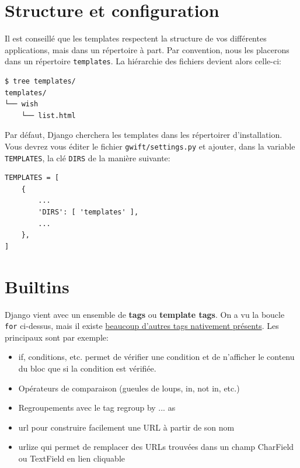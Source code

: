\documentclass[11pt]{amsbook}
\begin{document}
\hypertarget{x-structure-et-configuration}{\section{Structure et configuration}}
Il est conseillé que les templates respectent la structure de vos différentes applications, mais dans un répertoire à part. Par convention, nous les placerons dans un répertoire \texttt{templates}. La hiérarchie des fichiers devient alors celle-ci:


\begin{verbatim}
$ tree templates/
templates/
└── wish
    └── list.html
\end{verbatim}

Par défaut, Django cherchera les templates dans les répertoirer d’installation. Vous devrez vous éditer le fichier \texttt{gwift/settings.py} et ajouter, dans la variable \texttt{TEMPLATES}, la clé \texttt{DIRS} de la manière suivante:


\begin{verbatim}
TEMPLATES = [
    {
        ...
        'DIRS': [ 'templates' ],
        ...
    },
]
\end{verbatim}

\hypertarget{x-builtins}{\section{Builtins}}
Django vient avec un ensemble de \textbf{tags} ou \textbf{template tags}. On a vu la boucle \texttt{for} ci-dessus, mais il existe \href{https://docs.djangoproject.com/fr/1.9/ref/templates/builtins/}{beaucoup d’autres tags nativement présents}. Les principaux sont par exemple:


\begin{itemize}

\item if, conditions, etc. permet de vérifier une condition et de n’afficher le contenu du bloc que si la condition est vérifiée.

\item Opérateurs de comparaison (gueules de loups, in, not in, etc.)

\item Regroupements avec le tag regroup by ... as 

\item url pour construire facilement une URL à partir de son nom

\item urlize qui permet de remplacer des URLs trouvées dans un champ CharField ou TextField en lien cliquable

\end{itemize}
\end{document}
